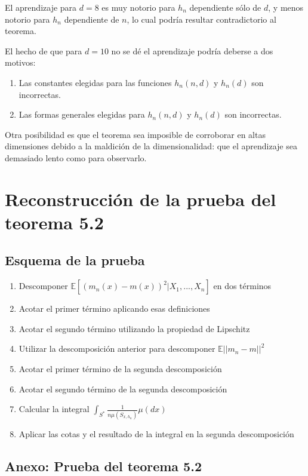 \documentclass[12pt, a4paper]{article}
\begin{document}
El aprendizaje para $d=8$ es muy notorio para $h_n$ dependiente sólo de $d$, y menos notorio para $h_n$ dependiente de $n$, lo cual podría resultar contradictorio al teorema.

El hecho de que para $d=10$ no se dé el aprendizaje podría deberse a dos motivos:
\begin{enumerate}
  \item Las constantes elegidas para las funciones $h_n(n,d)$ y $h_n(d)$ son incorrectas.
  \item Las formas generales elegidas para $h_n(n,d)$ y $h_n(d)$ son incorrectas.
\end{enumerate}

Otra posibilidad es que el teorema sea imposible de corroborar en altas dimensiones debido a la maldición de la dimensionalidad: que el aprendizaje sea demasiado lento como para observarlo.


\newpage
\section{Reconstrucción de la prueba del teorema 5.2}
\subsection{Esquema de la prueba}

\begin{enumerate}
  \item Descomponer $ \mathds{E}[ (m_n(x) - m(x))^2 | X_1, ..., X_n] $ en dos términos
  \item Acotar el primer término aplicando esas definiciones
  \item Acotar el segundo término utilizando la propiedad de Lipschitz
  \item Utilizar la descomposición anterior para descomponer $\mathds{E}|| m_n -m ||^2$
  \item Acotar el primer término de la segunda descomposición
  \item Acotar el segundo término de la segunda descomposición
  \item Calcular la integral $\int_{S^{*}} \frac{1}{n\mu(S_{x,h_n})} \mu(dx) $
  \item Aplicar las cotas y el resultado de la integral en la segunda descomposición 
\end{enumerate}

\subsection{Anexo: Prueba del teorema 5.2}
\end{document}
